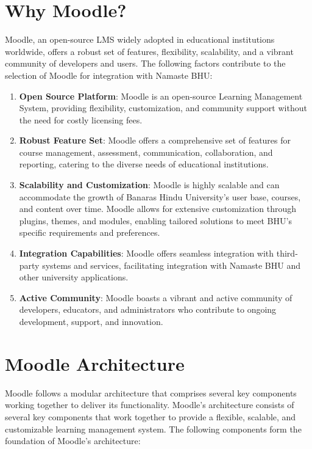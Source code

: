 \section{Why Moodle?}
Moodle, an open-source LMS widely adopted in educational institutions worldwide, offers a robust set of features, flexibility, scalability, and a vibrant community of developers and users. The following factors contribute to the selection of Moodle for integration with Namaste BHU:

\begin{enumerate}
    \item \textbf{Open Source Platform}: Moodle is an open-source Learning Management System, providing flexibility, customization, and community support without the need for costly licensing fees.
    \item \textbf{Robust Feature Set}: Moodle offers a comprehensive set of features for course management, assessment, communication, collaboration, and reporting, catering to the diverse needs of educational institutions.
    \item \textbf{Scalability and Customization}: Moodle is highly scalable and can accommodate the growth of Banaras Hindu University's user base, courses, and content over time. Moodle allows for extensive customization through plugins, themes, and modules, enabling tailored solutions to meet BHU's specific requirements and preferences.
    \item \textbf{Integration Capabilities}: Moodle offers seamless integration with third-party systems and services, facilitating integration with Namaste BHU and other university applications.
    \item \textbf{Active Community}: Moodle boasts a vibrant and active community of developers, educators, and administrators who contribute to ongoing development, support, and innovation.
\end{enumerate}

\section{Moodle Architecture}
Moodle follows a modular architecture that comprises several key components working together to deliver its functionality. Moodle's architecture consists of several key components that work together to provide a flexible, scalable, and customizable learning management system. The following components form the foundation of Moodle's architecture:

